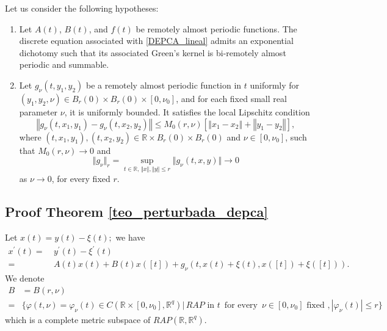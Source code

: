 \documentclass[english,,reqno]{amsart}
\numberwithin{equation}{section}
\newcommand{\bb}[1]{\mathbb{#1}}
\theoremstyle{plain}
\theoremstyle{definition}
\theoremstyle{remark}
\begin{document}
Let us consider the following hypotheses:  
\begin{enumerate}[label=\textbf{(H.\arabic*)}]
\item\label{H1} Let $A(t)$, $B(t)$, and $f(t)$ be remotely almost periodic functions.  
The discrete equation associated with \eqref{DEPCA_lineal} admits an exponential dichotomy such that its associated Green's kernel is bi-remotely almost periodic and summable.

\item\label{H2} Let $g_{\nu}(t, y_1, y_2)$ be a remotely almost periodic function in $t$  
uniformly for $(y_1, y_2, \nu) \in B_r(0) \times B_r(0) \times [0, \nu_0]$,  
and for each fixed small real parameter $\nu$, it is uniformly bounded.  
It satisfies the local Lipschitz condition  
\[
\left\Vert g_{\nu}(t, x_1, y_1) - g_{\nu}(t, x_2, y_2) \right\Vert \leq M_0(r, \nu) \left[ \left\Vert x_1 - x_2 \right\Vert + \left\Vert y_1 - y_2 \right\Vert \right],
\]
where $(t, x_1, y_1), (t, x_2, y_2) \in \mathbb{R} \times B_r(0) \times B_r(0)$ and $\nu \in [0, \nu_0]$,  
such that $M_0(r, \nu) \to 0$ and  
\[
\Vert g_{\nu} \Vert_r = \sup_{t \in \mathbb{R},\, \Vert x \Vert, \Vert y \Vert \leq r} \Vert g_\nu(t, x, y) \Vert \to 0
\]  
as $\nu \to 0$, for every fixed $r$.
\end{enumerate}

\subsection{Proof Theorem \ref{teo_perturbada_depca} }
Let $x\left(t\right)=y\left(t\right)-\xi\left(t\right);$ we have
\[
\begin{aligned}
x^{\prime}(t)  = &~{} y^{\prime}(t)-\xi^{\prime}(t)\nonumber \\
  = &~{} A\left(t\right)x\left(t\right)+B\left(t\right)x\left(\left[t\right]\right)+ g_{\nu}\left(t,x\left(t\right)+\xi\left(t\right),x\left(\left[t\right]\right)+\xi\left(\left[t\right]\right)\right).\label{eq:3.4}
\end{aligned}
\]
We denote 
\[
\begin{aligned}
B & =B\left(r,\nu\right)
\\=&  \big\{ \varphi\left(t,\nu\right)=\varphi_{\nu}(t)\in C\left(\mathbb{R}\times\left[0,\nu_{0}\right],\mathbb{R}^{q}\right) \big|\, RAP\mbox{ in } 
 t\,\mbox{ for every }\,\nu\in\left[0,\nu_{0}\right]\mbox{ fixed },\left|\varphi_{\nu}\left(t\right)\right|\leq r\big\} 
\end{aligned}
\]
which is a complete metric subspace of $RAP(\bb{R},\mathbb{R}^{q})$.
\end{document}
